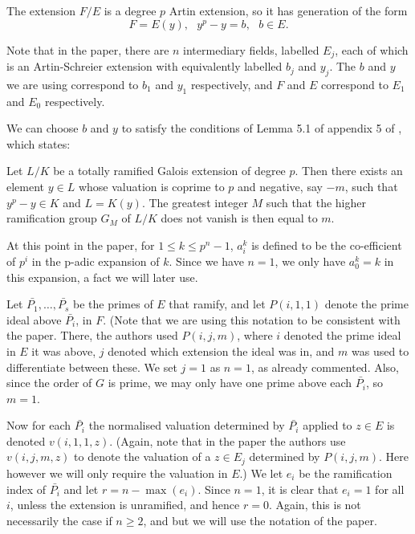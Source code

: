 The extension $F/E$ is a degree $p$ Artin extension, so it has generation of the form 
\[
F=E(y), \mbox{	} y^p-y = b, \mbox{	} b\in E.
\]

Note that in the paper, there are $n$ intermediary fields, labelled $E_j$, each of which is an Artin-Schreier extension with equivalently labelled $b_j$ and $y_j$.
The $b$ and $y$ we are using correspond to $b_1$ and $y_1$ respectively, and $F$ and $E$ correspond to $E_1$ and $E_0$ respectively.


We can choose $b$ and $y$ to satisfy the conditions of Lemma 5.1 of appendix 5 of \cite{quaddiffequi}, which states:


\begin{lem}\label{koeck}
Let $L/K$ be a totally ramified Galois extension of degree $p$.
Then there exists an element $y \in L$ whose valuation is coprime to $p$ and
negative, say $-m$, such that $y^p - y \in K$ and $L = K(y)$. The greatest
integer $M$ such that the higher ramification group $G_M$ of $L/K$ does not vanish
is then equal to $m$.
\end{lem}


At this point in the paper, for $1\leq k \leq p^n-1$, $a_i^k$ is defined to be the co-efficient of $p^i$ in the p-adic expansion of $k$. 
Since we have $n=1$, we only have $a_0^k = k$ in this expansion, a fact we will later use.

Let $\bar{P_1},\dots , \bar{P_s}$ be the primes of $E$ that ramify, and let $P(i,1,1)$ denote the prime ideal above $\bar{P_i}$, in $F$.
(Note that we are using this notation to be consistent with the paper. 
There, the authors used $P(i,j,m)$, where $i$ denoted the prime ideal in $E$ it was above, $j$ denoted which extension the ideal was in, and $m$ was used to differentiate between these.
We set $j=1$ as $n=1$, as already commented.
Also, since the order of $G$ is prime, we may only have one prime above each $\bar{P_i}$, so $m=1$.


Now for each $\bar{P_i}$ the normalised valuation determined by $\bar{P_i}$ applied to $z\in E$ is denoted $v(i,1,1,z)$.
(Again, note that in the paper the authors use $v(i,j,m,z)$ to denote the valuation of a $z\in E_j$ determined by $P(i,j,m).$
Here however we will only require the valuation in $E$.)
We let $e_i$ be the ramification index of $\bar{P_i}$ and let $r=n-\max(e_i)$.
Since $n=1$, it is clear that $e_i=1$ for all $i$, unless the extension is unramified, and hence $r=0$.
Again, this is not necessarily the case if $n\geq 2$, and but we will use the notation of the paper.

